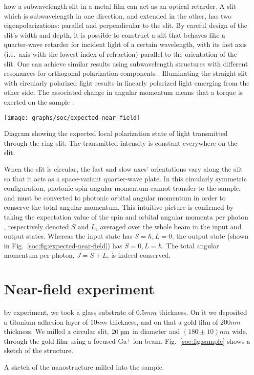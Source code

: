  how a subwavelength slit in a metal film can act as an optical retarder. A slit which is subwavelength in one direction, and extended in the other, has two eigenpolarizations: parallel and perpendicular to the slit. By careful design of the slit's width and depth, it is possible to construct a slit that behaves like a quarter-wave retarder for incident light of a certain wavelength, with its fast axis (i.e.\ axis with the lowest index of refraction) parallel to the orientation of the slit.
One can achieve similar results using subwavelength structures with different resonances for orthogonal polarization components \cite{Roberts2012, Genevet2012}.
Illuminating the straight slit with circularly polarized light results in linearly polarized light emerging from the other side. The associated change in angular momentum means that a torque is exerted on the sample \cite{Beth1936}.

\begin{marginfigure}
  \texttt{[image: graphs/soc/expected-near-field]}
  \caption{Diagram showing the expected local polarization state of light transmitted through the ring slit.
  The transmitted intensity is constant everywhere on the slit.}
  \label{soc:fig:expected-near-field}
\end{marginfigure}%
When the slit is circular, the fast and slow axes' orientations vary along the slit so that it acts as a space-variant quarter-wave plate. In this circularly symmetric configuration, photonic spin angular momentum cannot transfer to the sample, and must be converted to photonic orbital angular momentum in order to conserve the total angular momentum. This intuitive picture is confirmed by taking the expectation value of the spin and orbital angular momenta per photon \cite{Berry2005}, respectively denoted $S$ and $L$, averaged over the whole beam in the input and output states.  Whereas the input state has $S = \hbar, L = 0$, the output state (shown in Fig.~\ref{soc:fig:expected-near-field}) has $S = 0, L = \hbar $. The total angular momentum per photon, $J = S + L$, is indeed conserved.

\section{Near-field experiment}
\label{soc:sec:near-field}

 by experiment, we took a glass substrate of $0.5\unit{mm}$ thickness. On it we deposited a titanium adhesion layer of $10\unit{nm}$ thickness, and on that a gold film of $200\unit{nm}$ thickness. We milled a circular slit, $20\micron$ in diameter and $(180\pm 10)\unit{nm}$ wide, through the gold film using a focused Ga$^+$ ion beam. Fig.~\ref{soc:fig:sample} shows a sketch of the structure.
%
\begin{marginfigure}[14pt]
  \caption{A sketch of the nanostructure milled into the sample.}
  \label{soc:fig:sample}
\end{marginfigure}

